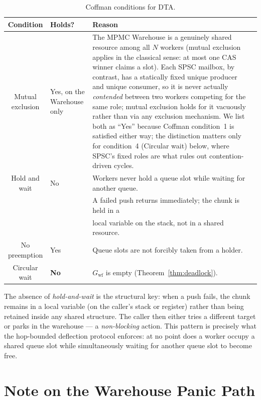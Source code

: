 \documentclass[11pt,a4paper]{article}
\begin{document}
\begin{table}[h]
\centering
\small
\caption{Coffman conditions for DTA.}
\label{tab:coffman}
\begin{tabularx}{\textwidth}{@{}clXl@{}}
\toprule
Condition & Holds? & Reason \\
\midrule
Mutual exclusion
  & Yes, on the Warehouse only
  & The MPMC Warehouse is a genuinely shared resource among all $N$
    workers (mutual exclusion applies in the classical sense: at most
    one CAS winner claims a slot). Each SPSC mailbox, by contrast, has
    a statically fixed unique producer and unique consumer, so it is
    never actually \emph{contended} between two workers competing for
    the same role; mutual exclusion holds for it vacuously rather than
    via any exclusion mechanism. We list both as ``Yes'' because
    Coffman condition~1 is satisfied either way; the distinction
    matters only for condition~4 (Circular wait) below, where SPSC's
    fixed roles are what rules out contention-driven cycles. \\
Hold and wait
  & No
  & Workers never hold a queue slot while waiting for another queue. \\
  & &  A failed push returns immediately; the chunk is held in a \\
  & &  local variable on the stack, not in a shared resource. \\
No preemption
  & Yes
  & Queue slots are not forcibly taken from a holder. \\
Circular wait
  & \textbf{No}
  & $G_{\text{wf}}$ is empty (Theorem~\ref{thm:deadlock}). \\
\bottomrule
\end{tabularx}
\end{table}

The absence of \emph{hold-and-wait} is the structural key: when a
push fails, the chunk remains in a local variable (on the caller's
stack or register) rather than being retained inside any shared
structure.  The caller then either tries a different target or parks
in the warehouse --- a \emph{non-blocking} action.  This pattern is
precisely what the hop-bounded deflection protocol enforces: at no
point does a worker occupy a shared queue slot while simultaneously
waiting for another queue slot to become free.

\section{Note on the Warehouse Panic Path}
\end{document}
